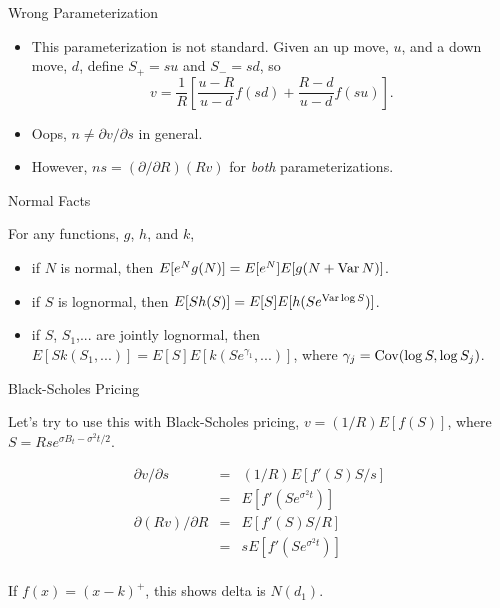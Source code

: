 \documentclass[pdf,colorBG,slideColor,blends]{prosper}
\def\Var{\mathop{\rm Var}}
\def\Cov{\mathop{\rm Cov}}
\begin{document}
\begin{slide}{Wrong Parameterization}

\begin{itemize}

\item This parameterization is not standard. Given an up move, $u$,
and a down move, $d$, define $S_+ = su$ and $S_- = sd$, so
$$
	v = \frac{1}{R}\left[\frac{u - R}{u - d} f(sd)
		+ \frac{R - d}{u - d} f(su)\right].
$$

\item Oops, $n \not= \partial v/\partial s$ in general.

\item However, $ns = (\partial/\partial R)(Rv)$ for {\em both}
parameterizations.

\end{itemize}

\end{slide}

\begin{slide}{Normal Facts}

For any functions, $g$, $h$, and $k$,

\begin{itemize}

\item if $N$ is normal, then $E[e^N g(N)] = E[e^N] E[g(N + \Var N)]$.

\item if $S$ is lognormal, then $E[S h(S)] = E[S] E[h(Se^{\Var\log S})]$.

\item if $S$, $S_1$,... are jointly lognormal, then
$E[S k(S_1,...)] = E[S] E[k(Se^{\gamma_1},...)]$, where
$\gamma_j = \Cov(\log S, \log S_j)$.

\end{itemize}

\end{slide}


\begin{slide}{Black-Scholes Pricing}

Let's try to use this with Black-Scholes pricing, $v = (1/R) E[f(S)]$,
where $S = Rse^{\sigma B_t - \sigma^2 t/2}$.

\begin{eqnarray*}
\partial v/\partial s &=& (1/R) E[f'(S) S/s]\\
	&=& E[f'(Se^{\sigma^2 t})]\\
\partial(Rv)/\partial R &=& E[f'(S) S/R]\\
	&=& s E[f'(Se^{\sigma^2 t})]\\
\end{eqnarray*}

If $f(x) = (x - k)^+$, this shows delta is $N(d_1)$.

\end{slide}
\end{document}
